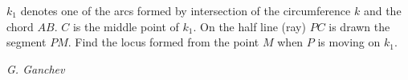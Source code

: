 $k_1$ denotes one of the arcs formed by intersection of the circumference $k$ and the chord $AB$. $C$ is the middle point of $k_1$. On the half line (ray) $PC$ is drawn the segment $PM$. Find the locus formed from the point $M$ when $P$ is moving on $k_1$.

\textit{G. Ganchev}